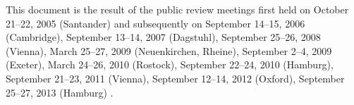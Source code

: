This document is the result of the public review meetings first held on
October 21--22, 2005 (Santander) and subsequently on
September 14--15, 2006 (Cambridge),
September 13--14, 2007 (Dagstuhl),
September 25--26, 2008 (Vienna),
March 25--27, 2009 (Neuenkirchen, Rheine),
September 2--4, 2009 (Exeter),
March 24--26, 2010 (Rostock),
September 22--24, 2010 (Hamburg),
September 21--23, 2011 (Vienna),
September 12--14, 2012 (Oxford),
September 25--27, 2013 (Ham\-burg)%
%
.
